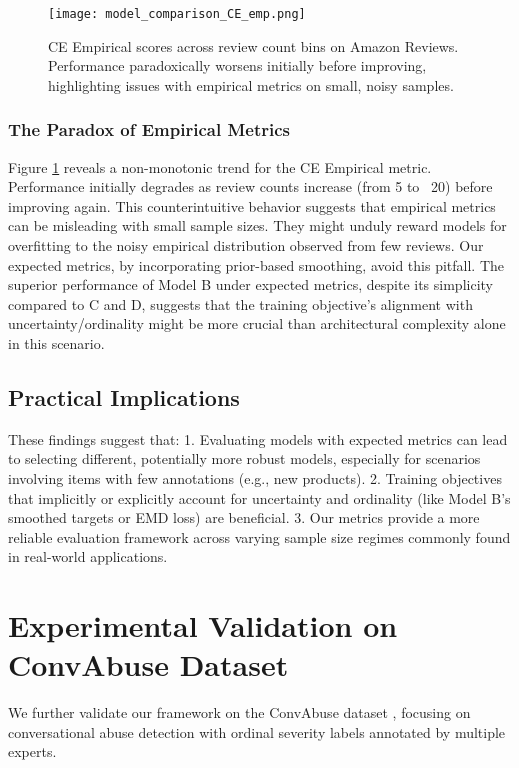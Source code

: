\documentclass[journal]{IEEEtran}
\begin{document}
\begin{figure}[t]
    \centering
    \texttt{[image: model\_comparison\_CE\_emp.png]}
    \caption{CE Empirical scores across review count bins on Amazon Reviews. Performance paradoxically worsens initially before improving, highlighting issues with empirical metrics on small, noisy samples.}
    \label{fig:ce_empirical_curve}
\end{figure}

\subsubsection{The Paradox of Empirical Metrics}
Figure \ref{fig:ce_empirical_curve} reveals a non-monotonic trend for the CE Empirical metric. Performance initially degrades as review counts increase (from 5 to ~20) before improving again. This counterintuitive behavior suggests that empirical metrics can be misleading with small sample sizes. They might unduly reward models for overfitting to the noisy empirical distribution observed from few reviews. Our expected metrics, by incorporating prior-based smoothing, avoid this pitfall. The superior performance of Model B under expected metrics, despite its simplicity compared to C and D, suggests that the training objective's alignment with uncertainty/ordinality might be more crucial than architectural complexity alone in this scenario.

\subsection{Practical Implications}
These findings suggest that:
1.  Evaluating models with expected metrics can lead to selecting different, potentially more robust models, especially for scenarios involving items with few annotations (e.g., new products).
2.  Training objectives that implicitly or explicitly account for uncertainty and ordinality (like Model B's smoothed targets or EMD loss) are beneficial.
3.  Our metrics provide a more reliable evaluation framework across varying sample size regimes commonly found in real-world applications.


\section{Experimental Validation on ConvAbuse Dataset}

We further validate our framework on the ConvAbuse dataset \cite{cercas2021}, focusing on conversational abuse detection with ordinal severity labels annotated by multiple experts.
\end{document}
